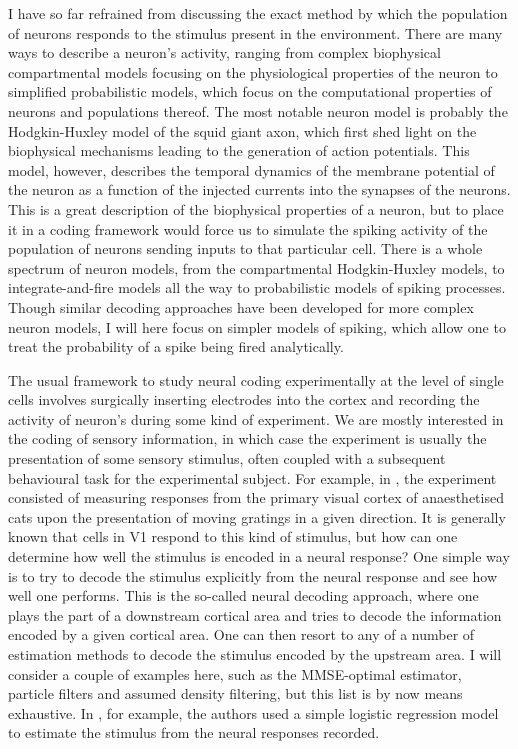 \label{sec:framework}

I have so far refrained from discussing the exact method by which the population of neurons responds to the stimulus present in the environment. There are many ways
to describe a neuron's activity, ranging from complex biophysical compartmental models focusing on the physiological properties of the neuron to simplified probabilistic 
models, which focus on the computational properties of neurons and populations thereof. The most notable neuron model is probably the Hodgkin-Huxley model of the
squid giant axon, which first shed light on the biophysical mechanisms leading to the generation of action potentials. This model, however, describes
the temporal dynamics of the membrane potential of the neuron as a function of the injected currents into the synapses of the neurons. This is a great description of the
biophysical properties of a neuron, but to place it in a coding framework would force us to simulate the spiking activity of the population of neurons sending inputs to
that particular cell. There is a whole spectrum of neuron models, from the compartmental Hodgkin-Huxley models, to integrate-and-fire models all the way to probabilistic
models of spiking processes. Though similar decoding approaches have been developed for more complex neuron models, I will here focus 
on simpler models of spiking, which allow one to treat the probability of a spike being 
fired analytically.
\par

The usual framework to study neural coding experimentally at the level of single cells involves surgically inserting electrodes into the cortex and recording the activity of 
neuron's during some kind
of experiment. We are mostly interested in the coding of sensory information, in which case the experiment is usually the presentation of some sensory stimulus, often
coupled with a subsequent behavioural task for the experimental subject. For example, in , the experiment consisted of measuring responses from
the primary visual cortex of anaesthetised cats upon the presentation of moving gratings in a given direction. It is generally known that cells in V1 respond to this kind
of stimulus, but how can one determine how well the stimulus is encoded in a neural response? One simple way is to try to decode the stimulus explicitly from the neural
response and see how well one performs. This is the so-called neural decoding approach, where one plays the part of a downstream cortical area and tries to decode the
information encoded by a given cortical area. One can then resort to any of a number of estimation methods to decode the stimulus encoded by the upstream area. I will
consider a couple of examples here, such as the MMSE-optimal estimator, particle filters and assumed density filtering, but this list is by now means exhaustive. In , for example, the authors used a simple logistic regression model to estimate the stimulus from the neural responses recorded.\par

